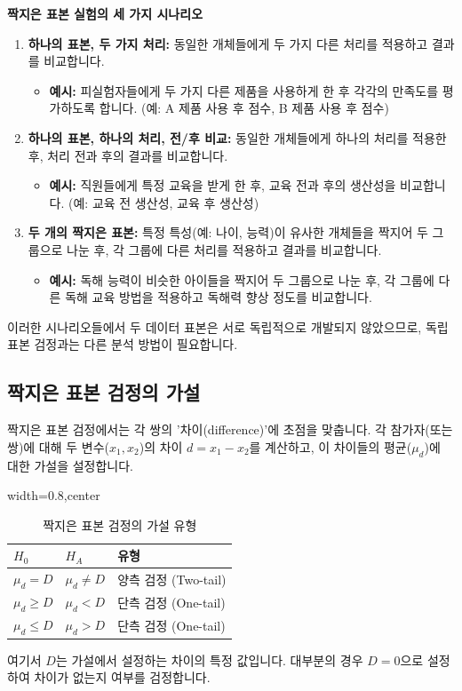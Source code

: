 \documentclass[11pt,a4paper]{article}
\begin{document}
\begin{examplebox}
\textbf{짝지은 표본 실험의 세 가지 시나리오}
\begin{enumerate}
    \item \textbf{하나의 표본, 두 가지 처리:} 동일한 개체들에게 두 가지 다른 처리를 적용하고 결과를 비교합니다.
    \begin{itemize}
        \item \textbf{예시:} 피실험자들에게 두 가지 다른 제품을 사용하게 한 후 각각의 만족도를 평가하도록 합니다. (예: A 제품 사용 후 점수, B 제품 사용 후 점수)
    \end{itemize}
    \item \textbf{하나의 표본, 하나의 처리, 전/후 비교:} 동일한 개체들에게 하나의 처리를 적용한 후, 처리 전과 후의 결과를 비교합니다.
    \begin{itemize}
        \item \textbf{예시:} 직원들에게 특정 교육을 받게 한 후, 교육 전과 후의 생산성을 비교합니다. (예: 교육 전 생산성, 교육 후 생산성)
    \end{itemize}
    \item \textbf{두 개의 짝지은 표본:} 특정 특성(예: 나이, 능력)이 유사한 개체들을 짝지어 두 그룹으로 나눈 후, 각 그룹에 다른 처리를 적용하고 결과를 비교합니다.
    \begin{itemize}
        \item \textbf{예시:} 독해 능력이 비슷한 아이들을 짝지어 두 그룹으로 나눈 후, 각 그룹에 다른 독해 교육 방법을 적용하고 독해력 향상 정도를 비교합니다.
    \end{itemize}
\end{enumerate}
이러한 시나리오들에서 두 데이터 표본은 서로 독립적으로 개발되지 않았으므로, 독립 표본 검정과는 다른 분석 방법이 필요합니다.
\end{examplebox}

\subsection*{짝지은 표본 검정의 가설}
짝지은 표본 검정에서는 각 쌍의 '차이(difference)'에 초점을 맞춥니다. 각 참가자(또는 쌍)에 대해 두 변수($x_1, x_2$)의 차이 $d = x_1 - x_2$를 계산하고, 이 차이들의 평균($\mu_d$)에 대한 가설을 설정합니다.

\begin{table}[h!]
\caption{짝지은 표본 검정의 가설 유형}
\label{tab:paired_hypotheses}
\centering
\begin{adjustbox}{width=0.8\textwidth,center}
\begin{tabular}{lll}
\toprule
\textbf{$H_0$} & \textbf{$H_A$} & \textbf{유형} \\
\midrule
$\mu_d = D$ & $\mu_d \ne D$ & 양측 검정 (Two-tail) \\
$\mu_d \ge D$ & $\mu_d < D$ & 단측 검정 (One-tail) \\
$\mu_d \le D$ & $\mu_d > D$ & 단측 검정 (One-tail) \\
\bottomrule
\end{tabular}
\end{adjustbox}
\end{table}
여기서 $D$는 가설에서 설정하는 차이의 특정 값입니다. 대부분의 경우 $D=0$으로 설정하여 차이가 없는지 여부를 검정합니다.
\end{document}
